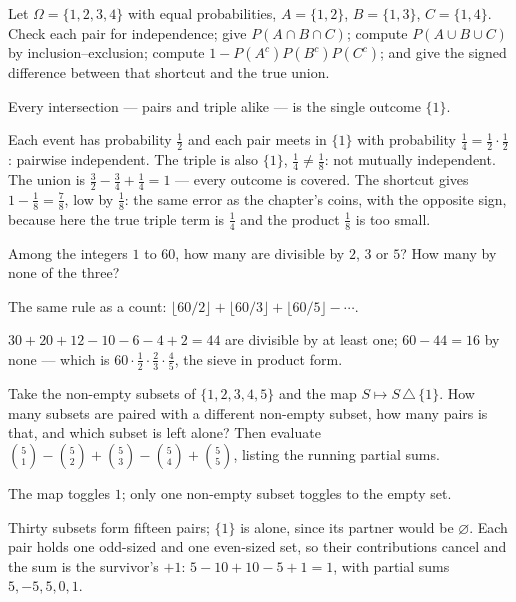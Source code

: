 \begin{problem}
Let $\Omega = \{1, 2, 3, 4\}$ with equal probabilities, $A = \{1,2\}$,
$B = \{1,3\}$, $C = \{1,4\}$. Check each pair for independence; give
$P(A \cap B \cap C)$; compute $P(A \cup B \cup C)$ by
inclusion–exclusion; compute $1 - P(A^c)P(B^c)P(C^c)$; and give the
signed difference between that shortcut and the true union.
\begin{hint}
Every intersection — pairs and triple alike — is the single outcome
$\{1\}$.
\end{hint}
\begin{solution}
Each event has probability $\tfrac12$ and each pair meets in $\{1\}$
with probability $\tfrac14 = \tfrac12\cdot\tfrac12$: pairwise
independent. The triple is also $\{1\}$, $\tfrac14 \ne \tfrac18$: not
mutually independent. The union is $\tfrac32 - \tfrac34 + \tfrac14 =
1$ — every outcome is covered. The shortcut gives $1 - \tfrac18 =
\tfrac78$, low by $\tfrac18$: the same error as the chapter's coins,
with the opposite sign, because here the true triple term is
$\tfrac14$ and the product $\tfrac18$ is too small.
\end{solution}
\end{problem}

\begin{problem}
Among the integers $1$ to $60$, how many are divisible by $2$, $3$ or
$5$? How many by none of the three?
\begin{hint}
The same rule as a count: $\lfloor 60/2 \rfloor + \lfloor 60/3 \rfloor
+ \lfloor 60/5 \rfloor - \cdots$.
\end{hint}
\begin{solution}
$30 + 20 + 12 - 10 - 6 - 4 + 2 = 44$ are divisible by at least one;
$60 - 44 = 16$ by none — which is $60 \cdot \tfrac12 \cdot \tfrac23
\cdot \tfrac45$, the sieve in product form.
\end{solution}
\end{problem}

\begin{problem}
Take the non-empty subsets of $\{1, 2, 3, 4, 5\}$ and the map $S
\mapsto S \,\triangle\, \{1\}$. How many subsets are paired with a
different non-empty subset, how many pairs is that, and which subset
is left alone? Then evaluate $\binom51 - \binom52 + \binom53 -
\binom54 + \binom55$, listing the running partial sums.
\begin{hint}
The map toggles $1$; only one non-empty subset toggles to the empty
set.
\end{hint}
\begin{solution}
Thirty subsets form fifteen pairs; $\{1\}$ is alone, since its partner
would be $\varnothing$. Each pair holds one odd-sized and one
even-sized set, so their contributions cancel and the sum is the
survivor's $+1$: $5 - 10 + 10 - 5 + 1 = 1$, with partial sums $5, -5,
5, 0, 1$.
\end{solution}
\end{problem}

